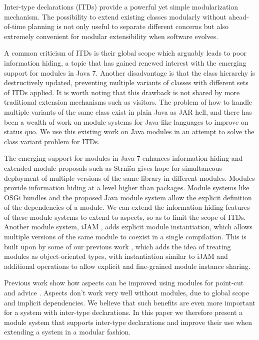 Inter-type declarations (ITDs) provide a powerful yet simple modularization
mechanism. The possibility to extend existing classes modularly without
ahead-of-time planning is not only useful to separate different concerns
but also extremely convenient for modular extensibility when software
evolves.

A common criticism of ITDs is their global scope which arguably leads to
poor information hiding, a topic that has gained renewed interest with the 
emerging support for modules in Java 7. Another disadvantage is that the 
class hierarchy is destructively updated, preventing multiple variants of 
classes with different sets of ITDs applied. It is worth noting that 
this drawback is not shared by more traditional extension mechanisms such 
as visitors. The problem of how to handle multiple variants of the same 
class exist in plain Java as JAR hell, and there has been a wealth of work 
on module systems for Java-like languages to improve on status quo. We use 
this existing work on Java modules in an attempt to solve the class 
variant problem for ITDs.

The emerging support for modules in Java 7 enhances information hiding and
extended module proposals such as Strni\v{s}a gives hope for simultaneous
deployment of multiple versions of the same library in different modules.
Modules provide information hiding at a level higher than packages. Module
systems like OSGi bundles\cite{OSGi4} and the proposed Java module system\cite{JSR277}
allow the explicit definition of the dependencies of a module. We can extend
the information hiding features of these module systems to extend to aspects, 
so as to limit the scope of ITDs.
Another module system, iJAM \cite{iJAM}, adds explicit module instantiation, 
which allows multiple versions of the same module to coexist in a single compilation.
This is built upon by some of our previous work \cite{modulesastypes}, which 
adds the idea of treating modules as object-oriented types, with instantiation
similar to iJAM and additional operations to allow explicit and fine-grained
module instance sharing. 



Previous work show how aspects can be improved using modules for point-cut
and advice \cite{openmodulesaj}. Aspects don't work very well without 
modules, due to global scope and implicit dependencies. We believe that 
such benefits are even more important for a system with inter-type 
declarations. In this paper we therefore present a module system that 
supports inter-type declarations and improve their use when extending a 
system in a modular fashion.

